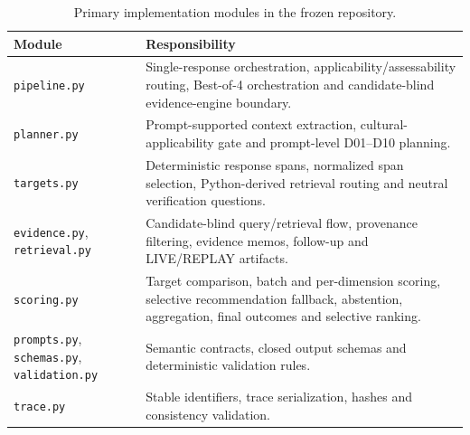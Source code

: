 \begin{table}[htbp]
\centering
\footnotesize
\caption{Primary implementation modules in the frozen repository.}
\label{tab:implementation-modules}
\begin{tabularx}{\textwidth}{p{4.0cm}X}
\toprule
\textbf{Module} & \textbf{Responsibility} \\
\midrule
\texttt{pipeline.py} & Single-response orchestration, applicability/assessability routing, Best-of-4 orchestration and candidate-blind evidence-engine boundary. \\
\texttt{planner.py} & Prompt-supported context extraction, cultural-applicability gate and prompt-level D01--D10 planning. \\
\texttt{targets.py} & Deterministic response spans, normalized span selection, Python-derived retrieval routing and neutral verification questions. \\
\texttt{evidence.py}, \texttt{retrieval.py} & Candidate-blind query/retrieval flow, provenance filtering, evidence memos, follow-up and LIVE/REPLAY artifacts. \\
\texttt{scoring.py} & Target comparison, batch and per-dimension scoring, selective recommendation fallback, abstention, aggregation, final outcomes and selective ranking. \\
\texttt{prompts.py}, \texttt{schemas.py}, \texttt{validation.py} & Semantic contracts, closed output schemas and deterministic validation rules. \\
\texttt{trace.py} & Stable identifiers, trace serialization, hashes and consistency validation. \\
\bottomrule
\end{tabularx}
\end{table}


